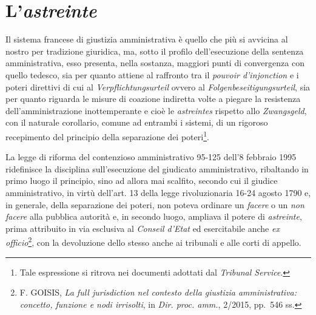 \documentclass[12pt,it,a4paper,]{report}
\begin{document}
\hypertarget{lastreinte}{%
\section{\texorpdfstring{L'\emph{astreinte}}{L'astreinte}}\label{lastreinte}}

Il sistema francese di giustizia amministrativa è quello che più si
avvicina al nostro per tradizione giuridica, ma, sotto il profilo
dell'esecuzione della sentenza amministrativa, esso presenta, nella
sostanza, maggiori punti di convergenza con quello tedesco, sia per
quanto attiene al raffronto tra il \emph{pouvoir d'injonction} e i
poteri direttivi di cui al \emph{Verpflichtungsurteil} ovvero al
\emph{Folgenbeseitigungsurteil}, sia per quanto riguarda le misure di
coazione indiretta volte a piegare la resistenza dell'amministrazione
inottemperante e cioè le \emph{astreintes} rispetto allo
\emph{Zwangsgeld}, con il naturale corollario, comune ad entrambi i
sistemi, di un rigoroso recepimento del principio della separazione dei
poteri\footnote{Tale espressione si ritrova nei documenti adottati dal
  \emph{Tribunal Service}.}.

La legge di riforma del contenzioso amministrativo 95-125 dell'8
febbraio 1995 ridefinisce la disciplina sull'esecuzione del giudicato
amministrativo, ribaltando in primo luogo il principio, sino ad allora
mai scalfito, secondo cui il giudice amministrativo, in virtù dell'art.
13 della legge rivoluzionaria 16-24 agosto 1790 e, in generale, della
separazione dei poteri, non poteva ordinare un \emph{facere} o un
\emph{non facere} alla pubblica autorità e, in secondo luogo, ampliava
il potere di \emph{astreinte}, prima attribuito in via esclusiva al
\emph{Conseil d'Etat} ed esercitabile anche \emph{ex
officio}\footnote{F. GOISIS, \emph{La full jurisdiction nel contesto
  della giustizia amministrativa: concetto, funzione e nodi irrisolti},
  in \emph{Dir. proc. amm.}, 2/2015, pp.~546 ss.}, con la devoluzione
dello stesso anche ai tribunali e alle corti di appello.
\end{document}
